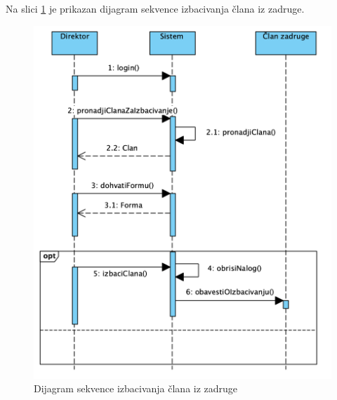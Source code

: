 \documentclass[a4paper, oneside]{article}
\begin{document}
Na slici \ref{dsekv_izbacivanje_iz_zadruge} je prikazan dijagram sekvence izbacivanja člana iz zadruge.
\begin{figure}[h!]
    \centering
    \includegraphics[scale=0.7]{images/dsekv_izbacivanje_iz_zadruge.png}
    \caption{Dijagram sekvence izbacivanja člana iz zadruge}
    \label{dsekv_izbacivanje_iz_zadruge}
\end{figure}
\clearpage
\end{document}
